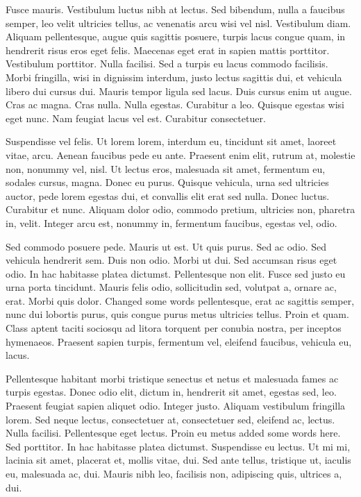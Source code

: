 Fusce mauris. Vestibulum luctus nibh at lectus. Sed bibendum, nulla a faucibus semper, leo velit ultricies tellus, ac venenatis arcu wisi vel nisl. Vestibulum diam. Aliquam pellentesque, augue quis sagittis posuere, turpis lacus congue quam, in hendrerit risus eros eget felis. Maecenas eget erat in sapien mattis porttitor. Vestibulum porttitor. Nulla facilisi. Sed a turpis eu lacus commodo facilisis. Morbi fringilla, wisi in dignissim interdum, justo lectus sagittis dui, et vehicula libero dui cursus dui. Mauris tempor ligula sed lacus. Duis cursus enim ut augue. Cras ac magna. Cras nulla. Nulla egestas. Curabitur a leo. Quisque egestas wisi eget nunc. Nam feugiat lacus vel est. Curabitur consectetuer.

Suspendisse vel felis. Ut lorem lorem, interdum eu, tincidunt sit amet, laoreet vitae, arcu. Aenean faucibus pede eu ante. Praesent enim elit, rutrum at, molestie non, nonummy vel, nisl. Ut lectus eros, malesuada sit amet, fermentum eu, sodales cursus, magna. Donec eu purus. Quisque vehicula, urna sed ultricies auctor, pede lorem egestas dui, et convallis elit erat sed nulla. Donec luctus. Curabitur et nunc. Aliquam dolor odio, commodo pretium, ultricies non, pharetra in, velit. Integer arcu est, nonummy in, fermentum faucibus, egestas vel, odio.

Sed commodo posuere pede. Mauris ut est. Ut quis purus. Sed ac odio. Sed vehicula hendrerit sem. Duis non odio. Morbi ut dui. Sed accumsan risus eget odio. In hac habitasse platea dictumst. Pellentesque non elit. Fusce sed justo eu urna porta tincidunt. Mauris felis odio, sollicitudin sed, volutpat a, ornare ac, erat. Morbi quis dolor. Changed some words pellentesque, erat ac sagittis semper, nunc dui lobortis purus, quis congue purus metus ultricies tellus. Proin et quam. Class aptent taciti sociosqu ad litora torquent per conubia nostra, per inceptos hymenaeos. Praesent sapien turpis, fermentum vel, eleifend faucibus, vehicula eu, lacus.

Pellentesque habitant morbi tristique senectus et netus et malesuada fames ac turpis egestas. Donec odio elit, dictum in, hendrerit sit amet, egestas sed, leo. Praesent feugiat sapien aliquet odio. Integer justo. Aliquam vestibulum fringilla lorem. Sed neque lectus, consectetuer at, consectetuer sed, eleifend ac, lectus. Nulla facilisi. Pellentesque eget lectus. Proin eu metus added some words here. Sed porttitor. In hac habitasse platea dictumst. Suspendisse eu lectus. Ut mi mi, lacinia sit amet, placerat et, mollis vitae, dui. Sed ante tellus, tristique ut, iaculis eu, malesuada ac, dui. Mauris nibh leo, facilisis non, adipiscing quis, ultrices a, dui.

